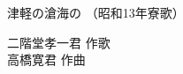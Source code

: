 \documentclass[10pt,b5j]{tarticle} %
\begin{document}
\begin{minipage}[c]{0.7\hsize} %
    \begin{center}
        {\LARGE
            津軽の滄海の %
        }
        {\small 
            （昭和13年寮歌） %
        }
    \end{center}
\end{minipage}
\begin{minipage}[c]{0.3\hsize} %
    \begin{flushright} %
        二階堂孝一君 作歌\\高橋寛君 作曲 %
    \end{flushright}
\end{minipage}
\end{document}
